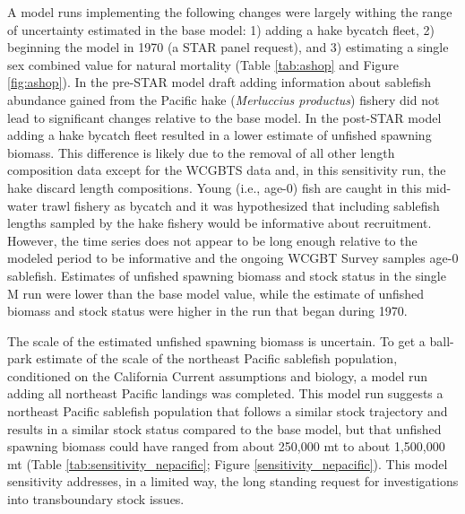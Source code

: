\documentclass[11pt,
  english,
  a4paper,
]{article}
\begin{document}
A model runs implementing the following changes were largely withing the range of uncertainty estimated in the base model: 1) adding a hake bycatch fleet, 2) beginning the model in 1970 (a STAR panel request), and 3) estimating a single sex combined value for natural mortality (Table \ref{tab:ashop} and Figure \ref{fig:ashop}). In the pre-STAR model draft adding information about sablefish abundance gained from the Pacific hake (\emph{Merluccius productus}) fishery did not lead to significant changes relative to the base model. In the post-STAR model adding a hake bycatch fleet resulted in a lower estimate of unfished spawning biomass. This difference is likely due to the removal of all other length composition data except for the WCGBTS data and, in this sensitivity run, the hake discard length compositions. Young (i.e., age-0) fish are caught in this mid-water trawl fishery as bycatch and it was hypothesized that including sablefish lengths sampled by the hake fishery would be informative about recruitment. However, the time series does not appear to be long enough relative to the modeled period to be informative and the ongoing WCGBT Survey samples age-0 sablefish. Estimates of unfished spawning biomass and stock status in the single M run were lower than the base model value, while the estimate of unfished biomass and stock status were higher in the run that began during 1970.

\leavevmode\tagmcend\tagstructend\par


The scale of the estimated unfished spawning biomass is uncertain. To get a ball-park estimate of the scale of the northeast Pacific sablefish population, conditioned on the California Current assumptions and biology, a model run adding all northeast Pacific landings was completed. This model run suggests a northeast Pacific sablefish population that follows a similar stock trajectory and results in a similar stock status compared to the base model, but that unfished spawning biomass could have ranged from about 250,000 mt to about 1,500,000 mt (Table \ref{tab:sensitivity_nepacific}; Figure \ref{sensitivity_nepacific}). This model sensitivity addresses, in a limited way, the long standing request for investigations into transboundary stock issues.

\leavevmode\tagmcend\tagstructend\par

\end{document}
